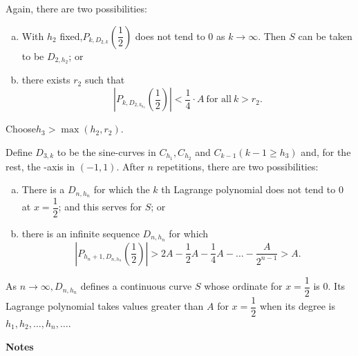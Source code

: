 Again, there are two possibilities:
\begin{enumerate}[(a)]
\item With $h_2$ fixed,$P_{k,D_{2,k}}\left(\dfrac{1}{2}\right)$ does not tend to
  0 as $k \to \infty$. Then $S$ can be taken to be $D_{2, h_2}$; or 
\item there exists $r_2$ such that 
  $$
  |P_{k,D_{2,k_{h_2}}}\left(\frac{1}{2}\right)| < \frac{1}{4}\cdot A ~\text{for all}~ k>r_2.
  $$
\end{enumerate}

Choose\pageoriginale $h_3 > \max (h_2,r_2)$.

Define $D_{3,k}$ to be the sine-curves in $C_{h_{1}},C_{h_{2}}$ and
$C_{k-1}(k-1 \geq h_3)$ and, for the rest, the -axis in
$(-1,1)$. After $n$ repetitions, there are two possibilities: 
\begin{enumerate}[(a)]
\item There is a $D_{n, h_n}$ for which the $k$ th Lagrange polynomial
  does not tend to $0$ at $x = \dfrac{1}{2}$; and this serves for $S$;
  or  
\item there is an infinite sequence $D_{n, h_n}$  for which 
  $$
  |P_{h_n+1,D_{n, h_n}} \left(\frac{1}{2}\right)| > 2 A - \frac{1}{2} A -
  \frac{1}{4}A- \ldots - \frac{A}{2^{n-1}}>A. 
  $$
\end{enumerate}

As $n \to \infty,  D_{n, h_n}$ defines a continuous curve $S$ whose
ordinate for $x = \dfrac{1}{2}$ is $0$. Its Lagrange polynomial takes
values greater than $A$ for $x = \dfrac{1}{2}$ when its degree is
$h_1, h_2, \ldots,  h_n, \ldots$.  

\begin{center}
  \textbf{Notes}\pageoriginale
\end{center}


